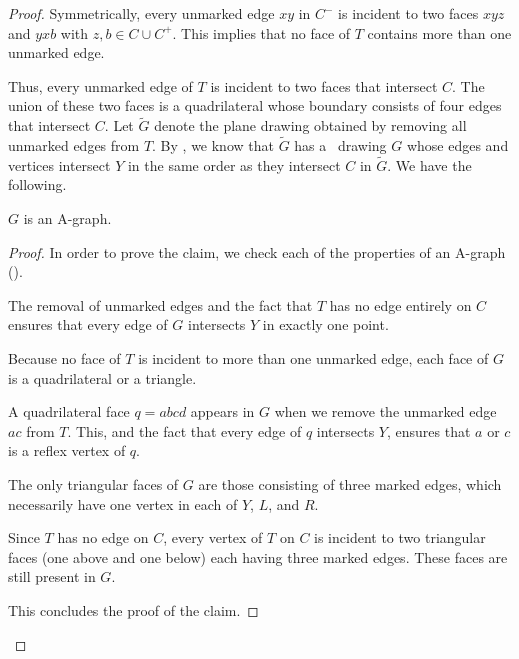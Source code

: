 \begin{proof}
	Symmetrically, every unmarked edge $xy$ in $C^-$ is incident to two faces
	$xyz$ and $yxb$ with $z,b\in C \cup C^+$.  This implies that no face of $T$ contains more than one unmarked edge.
	
	Thus, every unmarked edge of $T$ is incident to two faces that intersect $C$. The union of these two faces is a quadrilateral whose boundary consists of four edges that intersect $C$.
	Let $\tilde{G}$ denote the plane drawing obtained by removing all unmarked edges
	from $T$.  By , we know that $\tilde G$ has
	a \Fary\ drawing $G$ whose edges and vertices intersect $Y$ in the
	same order as they intersect $C$ in $\tilde{G}$. We have the following.
	
	\begin{claimx} \label{claim-a-graph}
		$G$ is an A-graph.
	\end{claimx}
	
	\begin{proof}
In order to	prove the claim, we check each of the properties of an A-graph
	().
	\begin{compactenum}
		\item The removal of unmarked edges and the fact that $T$ has no
		edge entirely on $C$ ensures that every edge of $G$ intersects $Y$
		in exactly one point.
		\item Because no face of $T$ is incident to more than one unmarked edge,
		each face of $G$ is a quadrilateral or a triangle.  
		\item A quadrilateral face $q=abcd$ appears in $G$ when we remove the unmarked edge $ac$ from $T$. This, and the fact that every edge of $q$ intersects $Y$, ensures that $a$ or $c$ is a reflex vertex of $q$.
		\item The only triangular faces of $G$ are those consisting
		of three marked edges, which necessarily have one vertex in
		each of $Y$, $L$, and $R$.
		\item Since $T$ has no edge on $C$, every vertex of $T$ on $C$
		is incident to two triangular faces (one above and one below)
		each having three marked edges. These faces are still present in $G$.
	\end{compactenum}
This concludes the proof of the claim.
\end{proof}	


\end{proof}
